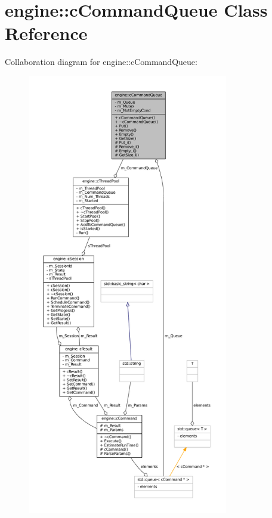 \hypertarget{classengine_1_1cCommandQueue}{
\section{engine\-:\-:c\-Command\-Queue \-Class \-Reference}
\label{classengine_1_1cCommandQueue}
}


\-Collaboration diagram for engine\-:\-:c\-Command\-Queue\-:\nopagebreak
\begin{figure}[H]
\begin{center}
\leavevmode
\includegraphics[height=550pt]{classengine_1_1cCommandQueue__coll__graph}
\end{center}
\end{figure}
